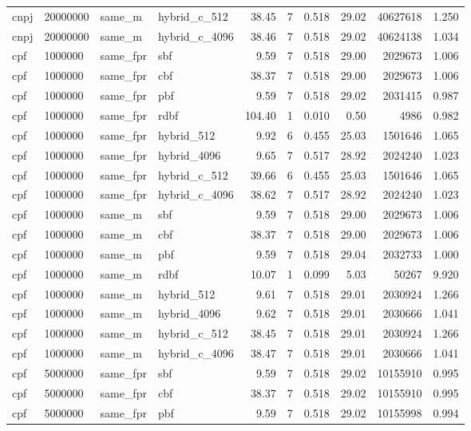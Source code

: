 \begin{tabular}{llllrrrrrr}
cnpj & 20000000 & same\_m & hybrid\_c\_512 & 38.45 & 7 & 0.518 & 29.02 & 40627618 & 1.250 \\
cnpj & 20000000 & same\_m & hybrid\_c\_4096 & 38.46 & 7 & 0.518 & 29.02 & 40624138 & 1.034 \\
cpf & 1000000 & same\_fpr & sbf & 9.59 & 7 & 0.518 & 29.00 & 2029673 & 1.006 \\
cpf & 1000000 & same\_fpr & cbf & 38.37 & 7 & 0.518 & 29.00 & 2029673 & 1.006 \\
cpf & 1000000 & same\_fpr & pbf & 9.59 & 7 & 0.518 & 29.02 & 2031415 & 0.987 \\
cpf & 1000000 & same\_fpr & rdbf & 104.40 & 1 & 0.010 & 0.50 & 4986 & 0.982 \\
cpf & 1000000 & same\_fpr & hybrid\_512 & 9.92 & 6 & 0.455 & 25.03 & 1501646 & 1.065 \\
cpf & 1000000 & same\_fpr & hybrid\_4096 & 9.65 & 7 & 0.517 & 28.92 & 2024240 & 1.023 \\
cpf & 1000000 & same\_fpr & hybrid\_c\_512 & 39.66 & 6 & 0.455 & 25.03 & 1501646 & 1.065 \\
cpf & 1000000 & same\_fpr & hybrid\_c\_4096 & 38.62 & 7 & 0.517 & 28.92 & 2024240 & 1.023 \\
cpf & 1000000 & same\_m & sbf & 9.59 & 7 & 0.518 & 29.00 & 2029673 & 1.006 \\
cpf & 1000000 & same\_m & cbf & 38.37 & 7 & 0.518 & 29.00 & 2029673 & 1.006 \\
cpf & 1000000 & same\_m & pbf & 9.59 & 7 & 0.518 & 29.04 & 2032733 & 1.000 \\
cpf & 1000000 & same\_m & rdbf & 10.07 & 1 & 0.099 & 5.03 & 50267 & 9.920 \\
cpf & 1000000 & same\_m & hybrid\_512 & 9.61 & 7 & 0.518 & 29.01 & 2030924 & 1.266 \\
cpf & 1000000 & same\_m & hybrid\_4096 & 9.62 & 7 & 0.518 & 29.01 & 2030666 & 1.041 \\
cpf & 1000000 & same\_m & hybrid\_c\_512 & 38.45 & 7 & 0.518 & 29.01 & 2030924 & 1.266 \\
cpf & 1000000 & same\_m & hybrid\_c\_4096 & 38.47 & 7 & 0.518 & 29.01 & 2030666 & 1.041 \\
cpf & 5000000 & same\_fpr & sbf & 9.59 & 7 & 0.518 & 29.02 & 10155910 & 0.995 \\
cpf & 5000000 & same\_fpr & cbf & 38.37 & 7 & 0.518 & 29.02 & 10155910 & 0.995 \\
cpf & 5000000 & same\_fpr & pbf & 9.59 & 7 & 0.518 & 29.02 & 10155998 & 0.994 \\

\end{tabular}
